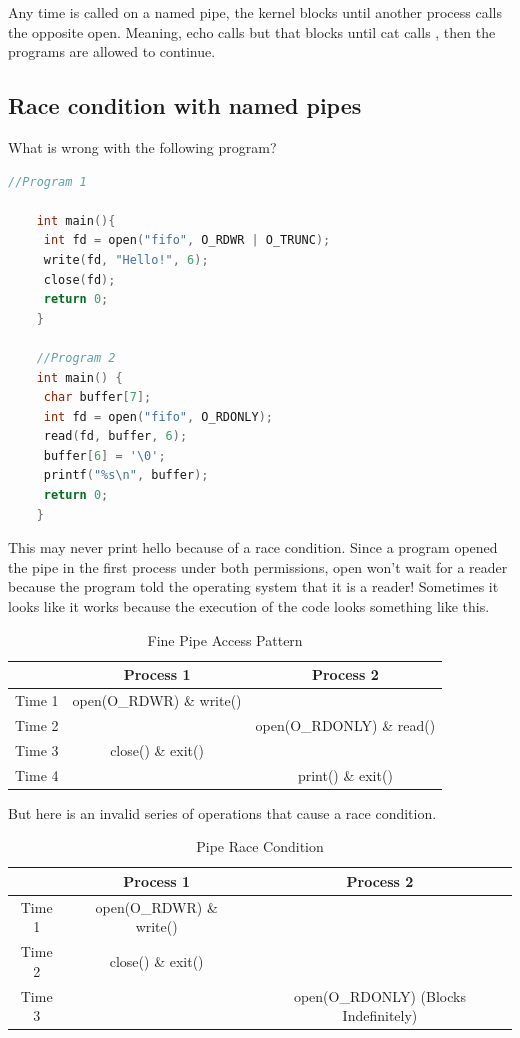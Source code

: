 Any time  is called on a named pipe, the kernel blocks until another process calls the opposite open. Meaning, echo calls  but that blocks until cat calls , then the programs are allowed to continue.
	 
\subsection{Race condition with named pipes}
	 
What is wrong with the following program?
	 
\begin{lstlisting}[language=C]
	//Program 1
	 
	int main(){
	 int fd = open("fifo", O_RDWR | O_TRUNC);
	 write(fd, "Hello!", 6);
	 close(fd);
	 return 0;
	}
	 
	//Program 2
	int main() {
	 char buffer[7];
	 int fd = open("fifo", O_RDONLY);
	 read(fd, buffer, 6);
	 buffer[6] = '\0';
	 printf("%s\n", buffer);
	 return 0;
	}
\end{lstlisting}
	 
This may never print hello because of a race condition.
Since a program opened the pipe in the first process under both permissions, open won't wait for a reader because the program told the operating system that it is a reader!
Sometimes it looks like it works because the execution of the code looks something like this.
	 
	\begin{table}[h]
		\centering
		\caption{Fine Pipe Access Pattern}
		\begin{tabular}{|c|c|c|}
			       & Process 1                & Process 2                 \\ \hline
			Time 1 & open(O\_RDWR) \& write() &                           \\
			Time 2 &                          & open(O\_RDONLY) \& read() \\
			Time 3 & close() \& exit()        &                           \\
			Time 4 &                          & print() \& exit()         \\
		\end{tabular}
	\end{table}
	 
But here is an invalid series of operations that cause a race condition.
	 
	\begin{table}[h]
		\centering
		\caption{Pipe Race Condition}
		\begin{tabular}{|c|c|c|}
			       & Process 1                & Process 2                             \\ \hline
			Time 1 & open(O\_RDWR) \& write() &                                       \\
			Time 2 & close() \& exit()        &                                       \\
			Time 3 &                          & open(O\_RDONLY) (Blocks Indefinitely) \\
		\end{tabular}
	\end{table}
	 
